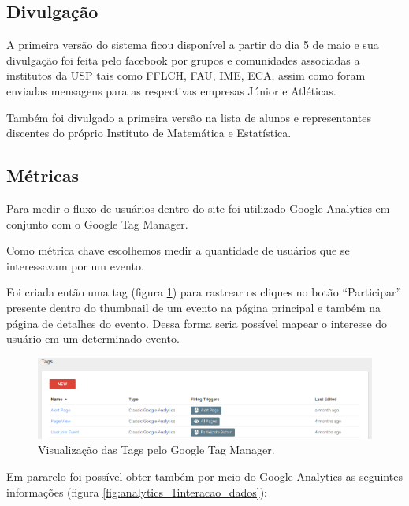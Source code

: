 \subsection{Divulgação}
\par A primeira versão do sistema ficou disponível a partir do dia 5 de maio e sua divulgação foi feita pelo facebook por grupos e comunidades associadas a institutos da USP tais como FFLCH, FAU, IME, ECA, assim como foram enviadas mensagens para as respectivas empresas Júnior e Atléticas.
\par Também foi divulgado a primeira versão na lista de alunos e representantes discentes do próprio Instituto de Matemática e Estatística.
\subsection{Métricas}
\par Para medir o fluxo de usuários dentro do site foi utilizado Google Analytics em conjunto com o Google Tag Manager.
\par Como métrica chave escolhemos medir a quantidade de usuários que se interessavam por um evento.
\par Foi criada então uma tag (figura \ref{fig:tags}) para rastrear os cliques no botão ``Participar'' presente dentro do thumbnail de um evento na página principal e também na página de detalhes do evento. Dessa forma seria possível mapear o interesse do usuário em um determinado evento.
\begin{figure}[htb]
\includegraphics[width=15cm]{figuras/tags}
\caption{\label{fig:tags} Visualização das Tags pelo Google Tag Manager.}
\end{figure}
\par Em pararelo foi possível obter também por meio do Google Analytics as seguintes informações (figura \ref{fig:analytics_1interacao_dados}):
